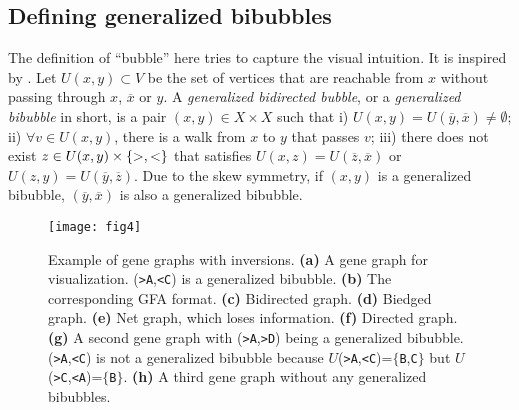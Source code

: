 \documentclass[webpdf,contemporary,large,namedate]{oup-authoring-template}%
\begin{document}
\subsection{Defining generalized bibubbles}


The definition of ``bubble'' here tries to capture the visual intuition.
It is inspired by \citet{DBLP:conf/wabi/OnoderaSS13}.
Let $U(x,y)\subset V$ be the set of vertices that are reachable from $x$ without passing through $x$, $\overline{x}$ or $y$.
A \emph{generalized bidirected bubble}, or a \emph{generalized bibubble} in short, is a pair $(x,y)\in X\times X$ such that
i) $U(x,y)=U(\overline{y},\overline{x})\not=\emptyset$;
ii) $\forall v\in U(x,y)$, there is a walk from $x$ to $y$ that passes $v$;
iii) there does not exist $z\in U(x,y)\times\{{\rm >},{\rm <}\}$
that satisfies $U(x,z)=U(\overline{z},\overline{x})$ or $U(z,y)=U(\overline{y},\overline{z})$.
Due to the skew symmetry, if $(x,y)$ is a generalized bibubble, $(\overline{y},\overline{x})$ is also a generalized bibubble.

\begin{figure}[t!]
\centering
\texttt{[image: fig4]}
\caption{Example of gene graphs with inversions.
{\bf (a)} A gene graph for visualization. ({\tt >A},{\tt <C}) is a generalized bibubble.
{\bf (b)} The corresponding GFA format.
{\bf (c)} Bidirected graph.
{\bf (d)} Biedged graph.
{\bf (e)} Net graph, which loses information.
{\bf (f)} Directed graph.
{\bf (g)} A second gene graph with ({\tt >A},{\tt >D}) being a generalized bibubble.
({\tt >A},{\tt <C}) is not a generalized bibubble because $U$({\tt >A},{\tt <C})=$\{${\tt B},{\tt C}$\}$
but $U$({\tt >C},{\tt <A})=$\{${\tt B}$\}$.
{\bf (h)} A third gene graph without any generalized bibubbles.
}\label{fig:inv}
\end{figure}
\end{document}
